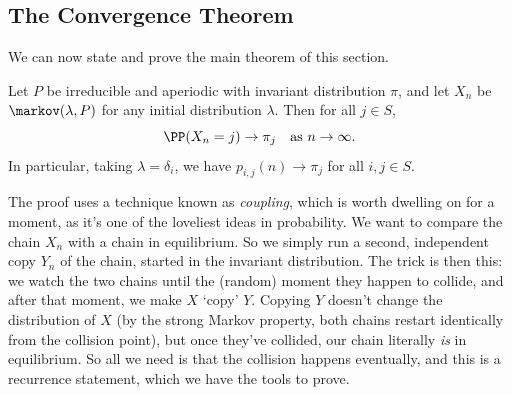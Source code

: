 \subsection{The Convergence Theorem}

We can now state and prove the main theorem of this section.

\begin{theorem}
	Let $P$ be irreducible and aperiodic with invariant distribution $\pi$, and let $X_n$ be $\markov(\lambda, P)$ for any initial distribution $\lambda$. Then for all $j \in S$,
	$$
	\PP(X_n = j) \rightarrow \pi_j \quad \text{as } n \rightarrow \infty.
	$$
	In particular, taking $\lambda = \delta_i$, we have $p_{i, j}(n) \rightarrow \pi_j$ for all $i, j \in S$.
\end{theorem}

The proof uses a technique known as \emph{coupling}, which is worth dwelling on for a moment, as it's one of the loveliest ideas in probability. We want to compare the chain $X_n$ with a chain in equilibrium. So we simply run a second, independent copy $Y_n$ of the chain, started in the invariant distribution. The trick is then this: we watch the two chains until the (random) moment they happen to collide, and after that moment, we make $X$ `copy' $Y$. Copying $Y$ doesn't change the distribution of $X$ (by the strong Markov property, both chains restart identically from the collision point), but once they've collided, our chain literally \emph{is} in equilibrium. So all we need is that the collision happens eventually, and this is a recurrence statement, which we have the tools to prove.

